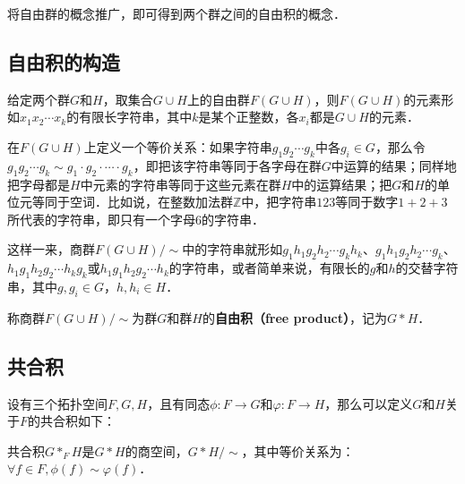 
将自由群的概念推广，即可得到两个群之间的自由积的概念．

\subsection{自由积的构造}

给定两个群$G$和$H$，取集合$G\cup H$上的自由群$F(G\cup H)$，则$F(G\cup H)$的元素形如$x_1x_2\cdots x_k$的有限长字符串，其中$k$是某个正整数，各$x_i$都是$G\cup H$的元素．

在$F(G\cup H)$上定义一个等价关系：如果字符串$g_1g_2\cdots g_k$中各$g_i\in G$，那么令$g_1g_2\cdots g_k\sim g_1\cdot g_2\cdot\cdots\cdot g_k$，即把该字符串等同于各字母在群$G$中运算的结果；同样地把字母都是$H$中元素的字符串等同于这些元素在群$H$中的运算结果；把$G$和$H$的单位元等同于空词．比如说，在整数加法群$\mathbb{Z}$中，把字符串$123$等同于数字$1+2+3$所代表的字符串，即只有一个字母$6$的字符串．

这样一来，商群$F(G\cup H)/\sim$中的字符串就形如$g_1h_1g_2h_2\cdots g_kh_k$、$g_1h_1g_2h_2\cdots g_k$、$h_1g_1h_2g_2\cdots h_kg_k$或$h_1g_1h_2g_2\cdots h_k$的字符串，或者简单来说，有限长的$g$和$h$的交替字符串，其中$g, g_i\in G$，$h, h_i\in H$．

称商群$F(G\cup H)/\sim$为群$G$和群$H$的\textbf{自由积（free product）}，记为$G*H$．

\subsection{共合积}

设有三个拓扑空间$F, G, H$，且有同态$\phi:F\rightarrow G$和$\varphi:F\rightarrow H$，那么可以定义$G$和$H$关于$F$的共合积如下：

共合积$G*_FH$是$G*H$的商空间，$G*H/\sim$，其中等价关系为：$\forall f\in F, \phi(f)\sim\varphi(f)$．


